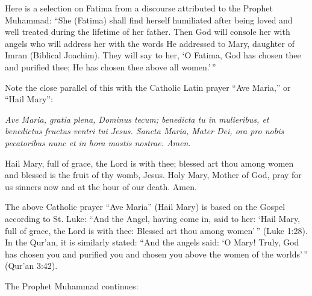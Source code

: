 Here is a selection on Fatima from a discourse attributed to the Prophet Muhammad: ``She (Fatima) shall find herself humiliated after being loved and well treated during the lifetime of her father. Then God will console her with angels who will address her with the words He addressed to Mary, daughter of Imran (Biblical Joachim). They will say to her, `O Fatima, God has chosen thee and purified thee; He has chosen thee above all women.'\,''

Note the close parallel of this with the Catholic Latin prayer ``Ave Maria,'' or ``Hail Mary'':

\begin{quotex}
\emph{Ave Maria, gratia plena, Dominus tecum; benedicta tu in mulieribus, et benedictus fructus ventri tui Jesus. Sancta Maria, Mater Dei, ora pro nobis pecatoribus nunc et in hora mostis nostrae. Amen.}

Hail Mary, full of grace, the Lord is with thee; blessed art thou among women and blessed is the fruit of thy womb, Jesus. Holy Mary, Mother of God, pray for us sinners now and at the hour of our death. Amen.
\end{quotex}


The above Catholic prayer ``Ave Maria'' (Hail Mary) is based on the Gospel according to St. Luke: ``And the Angel, having come in, said to her: `Hail Mary, full of grace, the Lord is with thee: Blessed art thou among women'\,'' (Luke 1:28). In the Qur'an, it is similarly stated: ``And the angels said: `O Mary! Truly, God has chosen you and purified you and chosen you above the women of the worlds'\,'' (Qur'an 3:42).

The Prophet Muhammad continues:

